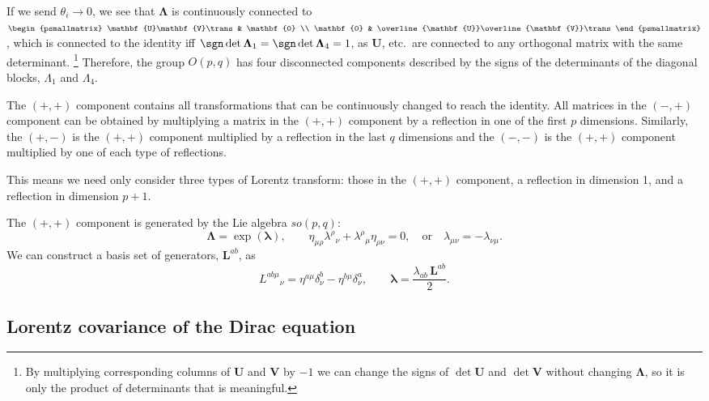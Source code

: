 \documentclass[11pt]{article}
\newcommand{\U}{\mathbf{U}}
\newcommand{\V}{\mathbf{V}}
\newcommand{\Ub}{\overline{\U}}
\newcommand{\Vb}{\overline{\V}}
\newcommand{\Lambdab}{\boldsymbol{\Lambda}}
\newcommand{\lambdab}{\boldsymbol{\lambda}}
\begin{document}
If we send \(\theta_i \to 0\), we see that \(\Lambdab\) is continuously connected to
\(
\begin{psmallmatrix}
  \U\V\trans & \mathbf{0} \\
  \mathbf{0} & \Ub\Vb\trans
\end{psmallmatrix}
\),
which is connected to the identity iff \(\sgn \det \Lambdab_1 = \sgn \det \Lambdab_4 = 1\), 
as \(\U\), etc.\ are connected to any orthogonal matrix with the same determinant.%
\footnote{By multiplying corresponding columns of \(\U\) and \(\V\) by \(-1\) we can change the signs of \(\det\U\) and \(\det\V\) without changing \(\Lambdab\), so it is only the product of determinants that is meaningful.}
Therefore, the group \(O(p,q)\) has four disconnected components described by the signs of the determinants of the diagonal blocks, \(\Lambda_1\) and  \(\Lambda_4\).

The \((+,+)\) component contains all transformations that can be continuously changed to reach the identity.
All matrices in the \((-,+)\) component can be obtained by multiplying a matrix in the \((+,+)\) component by a reflection in one of the first \(p\) dimensions.
Similarly, the \((+,-)\) is the \((+,+)\) component multiplied by a reflection in the last \(q\) dimensions and the \((-,-)\) is the \((+,+)\) component multiplied by one of each type of reflections.

This means we need only consider three types of Lorentz transform: those in the \((+,+)\) component, a reflection in dimension 1, and a reflection in dimension \(p+1\).

The \((+,+)\) component is generated by the Lie algebra \(so(p,q)\):
%
\begin{equation}\label{eq:lielorentz}
  \Lambdab = \exp(\lambdab),
  \qquad
  \eta_{\mu\rho} \lambda^\rho{}_\nu +  \lambda^\rho{}_\mu \eta_{\rho\nu} = 0,
  \quad \text{or} \quad
  \lambda_{\mu\nu} = - \lambda_{\nu\mu}.
\end{equation}
%
We can construct a basis set of generators, \(\mathbf{L}^{ab}\), as
%
\begin{equation}\label{eq:genlorentz}
  L^{ab\mu}{}_\nu = \eta^{a\mu} \delta^b_\nu - \eta^{b\mu} \delta_\nu^a,
  \qquad
  \lambdab = \frac{\lambda_{ab}\, \mathbf{L}^{ab}}{2}.
\end{equation}
%


\subsection{Lorentz covariance of the Dirac equation}\label{sec:diraclorentz}
\end{document}

